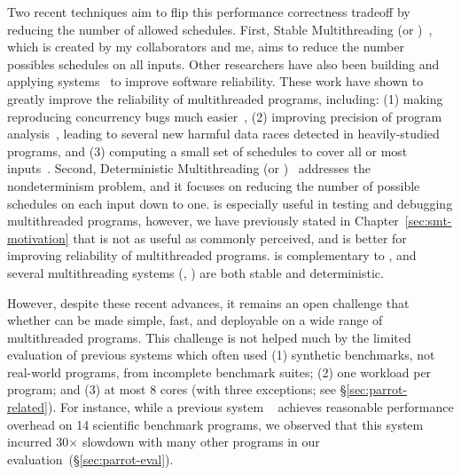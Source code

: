 Two recent techniques aim to flip this performance \vs correctness tradeoff
by reducing the number of allowed schedules. First, Stable Multithreading (or 
\smt)~\cite{determinator:osdi10, cui:tern:osdi10, dthreads:sosp11, 
peregrine:sosp11}, which is created by my collaborators and me, aims to reduce 
the number possibles schedules on all inputs. Other researchers have also been 
building and applying \smt
systems~\cite{determinator:osdi10, dthreads:sosp11, bergan:oopsla13} to improve
software reliability. These work have shown to greatly improve the
reliability of multithreaded programs, including: (1) making reproducing
concurrency bugs much easier~\cite{cui:tern:osdi10, peregrine:sosp11}, (2)
improving precision of program analysis~\cite{peregrine:sosp11, wu:pldi12},
leading to several new harmful data races detected in heavily-studied programs,
and (3) computing a small set of schedules to cover all or most 
inputs~\cite{bergan:oopsla13}. Second, Deterministic Multithreading
(or \dmt)~\cite{dmp:asplos09,kendo:asplos09,coredet:asplos10,
dos:osdi10,grace:oopsla09} addresses the nondeterminism problem, and it focuses
on reducing the number of possible schedules on each input down to one. \dmt is
especially useful in testing and debugging multithreaded programs, however, we
have previously stated in Chapter~\ref{sec:smt-motivation} that \dmt is not as
useful as commonly perceived, and \smt is better for improving reliability of
multithreaded programs. \smt is complementary to \dmt, and several 
multithreading systems (\eg, \cite{determinator:osdi10, dthreads:sosp11, 
cui:tern:osdi10, peregrine:sosp11}) are both stable and deterministic.

However, despite these recent advances, it remains an
open challenge that whether \smt can be made simple, fast, and 
deployable on a wide range of multithreaded programs.  
This challenge is not helped much by the limited
evaluation of previous systems which often used (1) synthetic benchmarks, not
real-world programs, from incomplete benchmark suites; (2) one workload
per program; and (3) at most 8 cores (with three exceptions; see
\S\ref{sec:parrot-related}). For instance, while a previous
system \dthreads~\cite{dthreads:sosp11} achieves reasonable performance 
overhead on 14 scientific benchmark programs, we observed that
this system incurred 30$\times$ slowdown with many other programs in our
evaluation~(\S\ref{sec:parrot-eval}).

